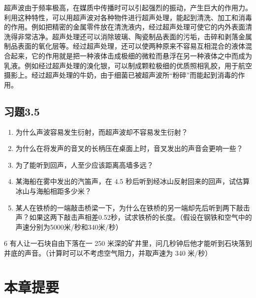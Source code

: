 超声波由于频率极高，在媒质中传播时可以引起强烈的振动，产生巨大的作用力。利用这种特性，可以用超声波对各种物件进行超声处理，能起到清洗、加工和消毒的作用。例如把精密的金属零件放在清洗液内，经过超声处理可使它的内外表面清洗得非常洁净。超声处理还可以消除玻璃、陶瓷制品表面的污垢，击碎和剥落金属制品表面的氧化层等。经过超声处理，还可以使两种原来不容易互相混合的液体混合起来，它的作用就是把一种液体击成极细的微粒而悬浮在另一种液体之中而成为乳液。例如经过超声处理的溴化银，可以制成颗粒极细的优质照相乳胶，用于航空摄影上。经过超声处理的牛奶，由于细菌已被超声波所``粉碎''而能起到消毒的作用。

\subsection{习题3.5}\label{ux4e60ux98983.5}

\begin{enumerate}
\def\labelenumi{\arabic{enumi}.}
\item
  为什么声波容易发生衍射，而超声波却不容易发生衍射？
\item
  为什么在将发声的音叉的长柄压在桌面上时，音叉发出的声音会更响一些？
\item
  为了能听到回声，人至少应该距离高墙多远？
\item
  某海船在雾中发出的汽笛声，在 4.5
  秒后听到经冰山反射回来的回声，试估算冰山与海船相距多少米？
\item
  某人在铁桥的一端敲击桥梁一下，为什么在铁桥的另一端却先后听到两下敲击声？如果这两下敲击声相差0.52秒，试求铁桥的长度。（假设在钢铁和空气中的声速分别为5000米/秒和340米/秒）
\end{enumerate}

6 有人让一石块自由下落在一 250
米深的矿井里，问几秒钟后他才能听到石块落到井底的声音。（计算时可以不考虑空气阻力，并取声速为
340 米/秒）

\section{本章提要}\label{ux672cux7ae0ux63d0ux8981-2}

